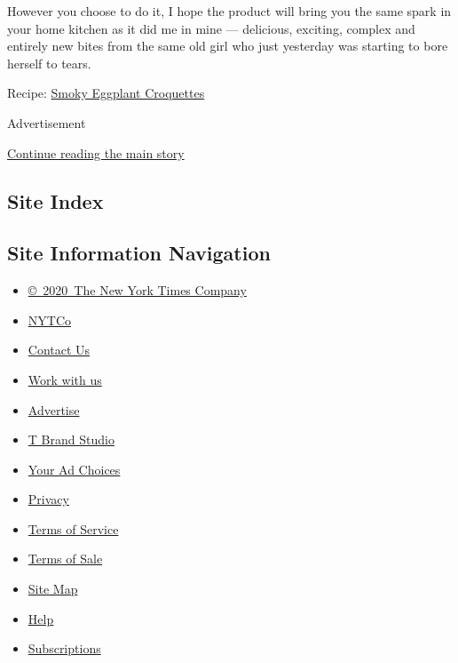 However you choose to do it, I hope the product will bring you the same
spark in your home kitchen as it did me in mine --- delicious, exciting,
complex and entirely new bites from the same old girl who just yesterday
was starting to bore herself to tears.

Recipe:
\href{https://cooking.nytimes.com/recipes/1021285-smoky-eggplant-croquettes?action=click\&module=Global\%20Search\%20Recipe\%20Card\&pgType=search\&rank=2}{Smoky
Eggplant Croquettes}

Advertisement

\protect\hyperlink{after-bottom}{Continue reading the main story}

\hypertarget{site-index}{%
\subsection{Site Index}\label{site-index}}

\hypertarget{site-information-navigation}{%
\subsection{Site Information
Navigation}\label{site-information-navigation}}

\begin{itemize}
\tightlist
\item
  \href{https://help.nytimes.com/hc/en-us/articles/115014792127-Copyright-notice}{©~2020~The
  New York Times Company}
\end{itemize}

\begin{itemize}
\tightlist
\item
  \href{https://www.nytco.com/}{NYTCo}
\item
  \href{https://help.nytimes.com/hc/en-us/articles/115015385887-Contact-Us}{Contact
  Us}
\item
  \href{https://www.nytco.com/careers/}{Work with us}
\item
  \href{https://nytmediakit.com/}{Advertise}
\item
  \href{http://www.tbrandstudio.com/}{T Brand Studio}
\item
  \href{https://www.nytimes.com/privacy/cookie-policy\#how-do-i-manage-trackers}{Your
  Ad Choices}
\item
  \href{https://www.nytimes.com/privacy}{Privacy}
\item
  \href{https://help.nytimes.com/hc/en-us/articles/115014893428-Terms-of-service}{Terms
  of Service}
\item
  \href{https://help.nytimes.com/hc/en-us/articles/115014893968-Terms-of-sale}{Terms
  of Sale}
\item
  \href{https://spiderbites.nytimes.com}{Site Map}
\item
  \href{https://help.nytimes.com/hc/en-us}{Help}
\item
  \href{https://www.nytimes.com/subscription?campaignId=37WXW}{Subscriptions}
\end{itemize}
